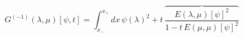 \begin{equation*}
G^{(-1)}(\lambda,\mu)[\psi,t] = \int_{x_-}^{x_+}dx\,\psi(\lambda)^2 +
t\,\overbrace{\frac{E(\lambda,\mu)[\psi]^2}{1-t\,E(\mu,\mu)[\psi]^2}}\,
\end{equation*}


